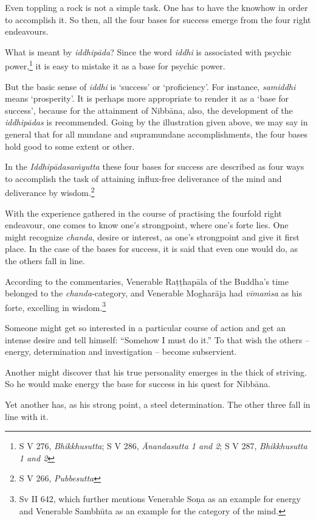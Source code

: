 Even toppling a rock is not a simple task. One has to have the knowhow in order to accomplish it. So then, all the four bases for success emerge from the four right endeavours.

What is meant by \emph{iddhipāda}? Since the word \emph{iddhi} is associated with psychic power,\footnote{S V 276, \emph{Bhikkhusutta}; S V 286, \emph{Ānandasutta 1 and 2}; S V 287, \emph{Bhikkhusutta 1 and 2}} it is easy to mistake it as a base for psychic power.

But the basic sense of \emph{iddhi} is `success' or `proficiency'. For instance, \emph{samiddhi} means `prosperity'. It is perhaps more appropriate to render it as a `base for success', because for the attainment of Nibbāna, also, the development of the \emph{iddhipādas} is recommended. Going by the illustration given above, we may say in general that for all mundane and supramundane accomplishments, the four bases hold good to some extent or other.

In the \emph{Iddhipādasaṁyutta} these four bases for success are described as four ways to accomplish the task of attaining influx-free deliverance of the mind and deliverance by wisdom.\footnote{S V 266, \emph{Pubbesutta}}

With the experience gathered in the course of practising the fourfold right endeavour, one comes to know one's strongpoint, where one's forte lies. One might recognize \emph{chanda}, desire or interest, as one's strongpoint and give it first place. In the case of the bases for success, it is said that even one would do, as the others fall in line.

According to the commentaries, Venerable Raṭṭhapāla of the Buddha's time belonged to the \emph{chanda}-category, and Venerable Mogharāja had \emph{vīmaṁsa} as his forte, excelling in wisdom.\footnote{Sv II 642, which further mentions Venerable Soṇa as an example for energy and Venerable Sambhūta as an example for the category of the mind.}

Someone might get so interested in a particular course of action and get an intense desire and tell himself: ``Somehow I must do it.'' To that wish the others -- energy, determination and investigation -- become subservient.

Another might discover that his true personality emerges in the thick of striving. So he would make energy the base for success in his quest for Nibbāna.

Yet another has, as his strong point, a steel determination. The other three fall in line with it.

